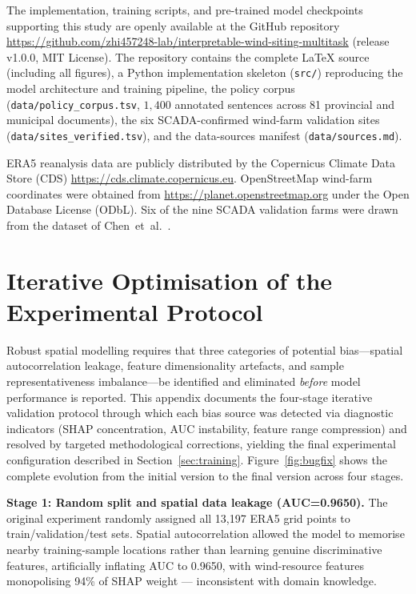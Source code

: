 \documentclass[12pt, a4paper]{article}
\begin{document}
\begin{sloppypar}
The implementation, training scripts, and pre-trained model
checkpoints supporting this study are openly available at
the GitHub repository
\url{https://github.com/zhi457248-lab/interpretable-wind-siting-multitask}
(release v1.0.0, MIT License). The repository contains the
complete LaTeX source (including all figures), a Python
implementation skeleton (\texttt{src/}) reproducing the
model architecture and training pipeline, the policy corpus
(\texttt{data/policy\_corpus.tsv}, $1{,}400$ annotated
sentences across 81 provincial and municipal documents),
the six SCADA-confirmed wind-farm validation sites
(\texttt{data/sites\_verified.tsv}), and the data-sources
manifest (\texttt{data/sources.md}).
\end{sloppypar}

\begin{sloppypar}
ERA5 reanalysis data are publicly distributed by the
Copernicus Climate Data Store (CDS)
\url{https://cds.climate.copernicus.eu}. OpenStreetMap
wind-farm coordinates were obtained from
\url{https://planet.openstreetmap.org} under the Open
Database License (ODbL). Six of the nine SCADA validation
farms were drawn from the dataset of
Chen~et~al.\ \cite{chen2022scada}.
\end{sloppypar}

\appendix
\renewcommand{\thefigure}{A\arabic{figure}}
\setcounter{figure}{0}
\section{Iterative Optimisation of the Experimental Protocol}
\label{sec:appendix}

Robust spatial modelling requires that three categories of 
potential bias---spatial autocorrelation leakage, feature 
dimensionality artefacts, and sample representativeness 
imbalance---be identified and eliminated \textit{before} 
model performance is reported. This appendix documents the 
four-stage iterative validation protocol through which each 
bias source was detected via diagnostic indicators (SHAP 
concentration, AUC instability, feature range compression) 
and resolved by targeted methodological corrections, yielding 
the final experimental configuration described in 
Section~\ref{sec:training}.
Figure~\ref{fig:bugfix} shows the complete evolution from the
initial version to the final version across four stages.

\textbf{Stage 1: Random split and spatial data leakage
(AUC=0.9650).} The original experiment randomly assigned all
13,197 ERA5 grid points to train/validation/test sets.
Spatial autocorrelation allowed the model to memorise nearby
training-sample locations rather than learning genuine
discriminative features, artificially inflating AUC to 0.9650,
with wind-resource features monopolising 94\% of SHAP weight
--- inconsistent with domain knowledge.
\end{document}
